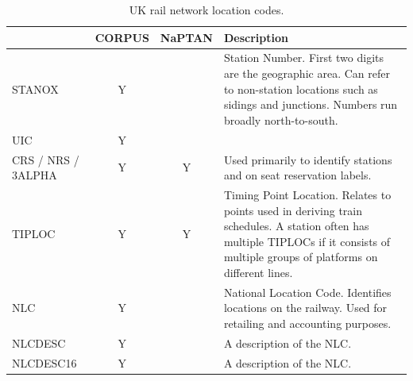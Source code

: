 \documentclass[12pt,a4paper]{article}
\begin{document}
\begin{table}[h!]
\centering
\caption{UK rail network location codes.}
\label{table:codes}
\begin{tabular}{|p{2.5cm}|c|c|p{8.5cm}|}
\hline
\textbf{}          & \multicolumn{1}{l|}{\textbf{CORPUS}} & \multicolumn{1}{l|}{\textbf{NaPTAN}} & \textbf{Description}                                                                                                                                                                \\ \hline
STANOX             & Y                                    &                                      & Station Number. First two digits are the geographic area. Can refer to non-station locations such as sidings and junctions. Numbers run broadly north-to-south.                     \\ \hline
UIC                & Y                                    &                                      &                                                                                                                                                                                     \\ \hline
CRS / NRS / 3ALPHA & Y                                    & Y                                    & Used primarily to identify stations and on seat reservation labels.                                                                                                                 \\ \hline
TIPLOC             & Y                                    & Y                                    & Timing Point Location. Relates to points used in deriving train schedules. A station often has multiple TIPLOCs if it consists of  multiple groups of platforms on different lines. \\ \hline
NLC                & Y                                    &                                      & National  Location Code. Identifies locations on the railway. Used for retailing and accounting purposes.                                                                           \\ \hline
NLCDESC            & Y                                    &                                      & A description of the NLC.                                                                                                                                                           \\ \hline
NLCDESC16          & Y                                    &                                      & A description of the NLC.                                                                                                                                                           \\ \hline

\end{tabular}
\end{table}
\end{document}
